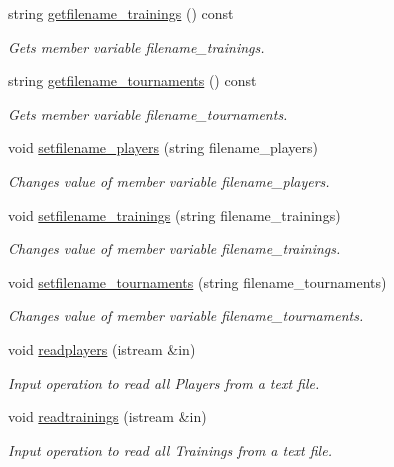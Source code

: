 \begin{DoxyCompactItemize}
string \hyperlink{class_club_a0807e91626c347847a36551c66e38985}{getfilename\+\_\+trainings} () const
\begin{DoxyCompactList}\small\item\em Gets member variable filename\+\_\+trainings. \end{DoxyCompactList}\item 
string \hyperlink{class_club_a95dd9fae1bd73060b8a64176aef5b848}{getfilename\+\_\+tournaments} () const
\begin{DoxyCompactList}\small\item\em Gets member variable filename\+\_\+tournaments. \end{DoxyCompactList}\item 
void \hyperlink{class_club_a215b1c939a82ae2d442d05bc58457cd4}{setfilename\+\_\+players} (string filename\+\_\+players)
\begin{DoxyCompactList}\small\item\em Changes value of member variable filename\+\_\+players. \end{DoxyCompactList}\item 
void \hyperlink{class_club_af1693f8321d273f68b3bcfebff5d4ac9}{setfilename\+\_\+trainings} (string filename\+\_\+trainings)
\begin{DoxyCompactList}\small\item\em Changes value of member variable filename\+\_\+trainings. \end{DoxyCompactList}\item 
void \hyperlink{class_club_a5bd4d91fd403f73a9b74778568e3e639}{setfilename\+\_\+tournaments} (string filename\+\_\+tournaments)
\begin{DoxyCompactList}\small\item\em Changes value of member variable filename\+\_\+tournaments. \end{DoxyCompactList}\item 
void \hyperlink{class_club_a8bae0203ecc348fa338ff5fcfd0cd6fb}{readplayers} (istream \&in)
\begin{DoxyCompactList}\small\item\em Input operation to read all Players from a text file. \end{DoxyCompactList}\item 
void \hyperlink{class_club_a918827ec97985e5f98d471f116098902}{readtrainings} (istream \&in)
\begin{DoxyCompactList}\small\item\em Input operation to read all Trainings from a text file. \end{DoxyCompactList}\item 

\end{DoxyCompactItemize}

